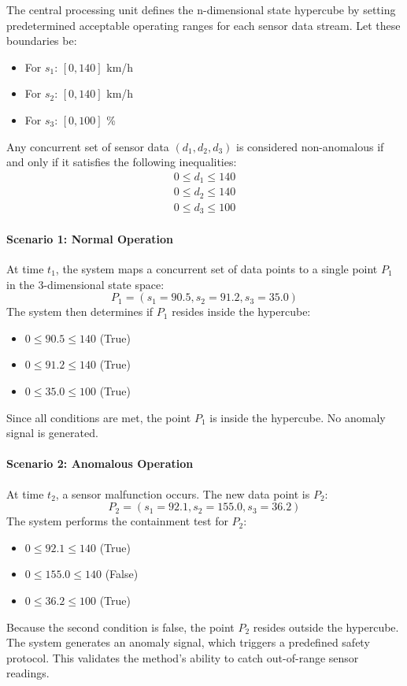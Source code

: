 \documentclass{article}
\begin{document}
The central processing unit defines the n-dimensional state hypercube by setting predetermined acceptable operating ranges for each sensor data stream. Let these boundaries be:
\begin{itemize}
    \item For $s_1$: $[0, 140]$ km/h
    \item For $s_2$: $[0, 140]$ km/h
    \item For $s_3$: $[0, 100]$ \%
\end{itemize}
Any concurrent set of sensor data $(d_1, d_2, d_3)$ is considered non-anomalous if and only if it satisfies the following inequalities:
\begin{align*}
    0 \le d_1 \le 140 \\
    0 \le d_2 \le 140 \\
    0 \le d_3 \le 100
\end{align*}

\paragraph{Scenario 1: Normal Operation}
At time $t_1$, the system maps a concurrent set of data points to a single point $P_1$ in the 3-dimensional state space:
\[ P_1 = (s_1=90.5, s_2=91.2, s_3=35.0) \]
The system then determines if $P_1$ resides inside the hypercube:
\begin{itemize}
    \item $0 \le 90.5 \le 140$ (True)
    \item $0 \le 91.2 \le 140$ (True)
    \item $0 \le 35.0 \le 100$ (True)
\end{itemize}
Since all conditions are met, the point $P_1$ is inside the hypercube. No anomaly signal is generated.

\paragraph{Scenario 2: Anomalous Operation}
At time $t_2$, a sensor malfunction occurs. The new data point is $P_2$:
\[ P_2 = (s_1=92.1, s_2=155.0, s_3=36.2) \]
The system performs the containment test for $P_2$:
\begin{itemize}
    \item $0 \le 92.1 \le 140$ (True)
    \item $0 \le 155.0 \le 140$ (False)
    \item $0 \le 36.2 \le 100$ (True)
\end{itemize}
Because the second condition is false, the point $P_2$ resides outside the hypercube. The system generates an anomaly signal, which triggers a predefined safety protocol. This validates the method's ability to catch out-of-range sensor readings.
\end{document}
